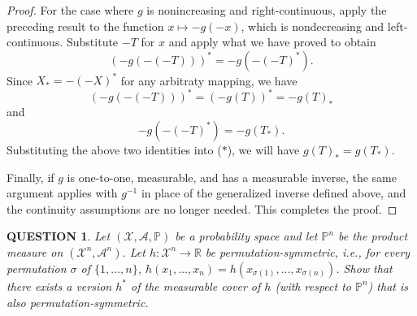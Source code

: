 \documentclass[12pt]{article}
\renewcommand{\(}{\left(}%
\renewcommand{\)}{\right)}%
\renewcommand{\[}{\left[}%
\renewcommand{\]}{\right]}%
\newcommand{\p}{\mathbb{P}}
\newtheorem{question}{QUESTION}[section]}
\newtheorem{proof}{Proof.}}
\begin{document}
\begin{proof}
For the case where $g$ is nonincreasing and right-continuous, apply the preceding result to the function $x\mapsto -g(-x)$, which is nondecreasing and left-continuous. Substitute $-T$ for $x$ and apply what we have proved to obtain
\begin{equation*}
(-g(-(-T)))^* = -g(-(-T)^*). \tag{$*$}
\end{equation*}
Since $X_*=-(-X)^*$ for any arbitraty mapping, we have 
\begin{equation*}
	(-g(-(-T)))^*=(-g(T))^*=-g(T)_*
\end{equation*}
and
\begin{equation*}
	-g(-(-T)^*)=-g(T_*).
\end{equation*}
Substituting the above two identities into ($*$), we will have $g(T)_* = g(T_*)$.

Finally, if $g$ is one-to-one, measurable, and has a measurable inverse, the same argument applies with $g^{-1}$ in place of the generalized inverse defined above, and the continuity assumptions are no longer needed. This completes the proof.
\end{proof}

\begin{question}
Let $(\mathcal X,\mathcal A,\p)$ be a probability space and let $\p^n$ be the product measure on $(\mathcal X^n,\mathcal A^n)$. 
Let $h:\mathcal X^n\to\mathbb R$ be \emph{permutation-symmetric}, i.e., for every permutation $\sigma$ of $\{1,\dots,n\}$,
$h(x_1,\dots,x_n)=h(x_{\sigma(1)},\dots,x_{\sigma(n)})$.
Show that there exists a version $h^*$ of the measurable cover of $h$ (with respect to $\p^n$) that is also permutation-symmetric.
\end{question}
\end{document}
